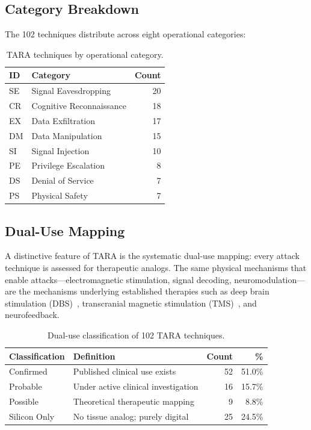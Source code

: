 \subsection{Category Breakdown}

The 102 techniques distribute across eight operational categories:

\begin{table}[H]
\centering
\caption{TARA techniques by operational category.}
\label{tab:categories}
\small
\begin{tabular}{@{}l l r@{}}
\toprule
\textbf{ID} & \textbf{Category} & \textbf{Count} \\
\midrule
SE & Signal Eavesdropping    & 20 \\
CR & Cognitive Reconnaissance & 18 \\
EX & Data Exfiltration       & 17 \\
DM & Data Manipulation       & 15 \\
SI & Signal Injection        & 10 \\
PE & Privilege Escalation    &  8 \\
DS & Denial of Service       &  7 \\
PS & Physical Safety         &  7 \\
\bottomrule
\end{tabular}
\end{table}

\subsection{Dual-Use Mapping}

A distinctive feature of TARA is the systematic dual-use mapping: every attack
technique is assessed for therapeutic analogs. The same physical mechanisms that
enable attacks---electromagnetic stimulation, signal decoding, neuromodulation---are
the mechanisms underlying established therapies such as deep brain stimulation
(DBS)~\cite{lozano2019dbs}, transcranial magnetic stimulation
(TMS)~\cite{hallett2007tms}, and neurofeedback.

\begin{table}[H]
\centering
\caption{Dual-use classification of 102 TARA techniques.}
\label{tab:dualuse}
\small
\begin{tabular}{@{}l l r r@{}}
\toprule
\textbf{Classification} & \textbf{Definition} & \textbf{Count} & \textbf{\%} \\
\midrule
Confirmed    & Published clinical use exists      & 52 & 51.0\% \\
Probable     & Under active clinical investigation & 16 & 15.7\% \\
Possible     & Theoretical therapeutic mapping     &  9 &  8.8\% \\
Silicon Only & No tissue analog; purely digital    & 25 & 24.5\% \\
\bottomrule
\end{tabular}
\end{table}

